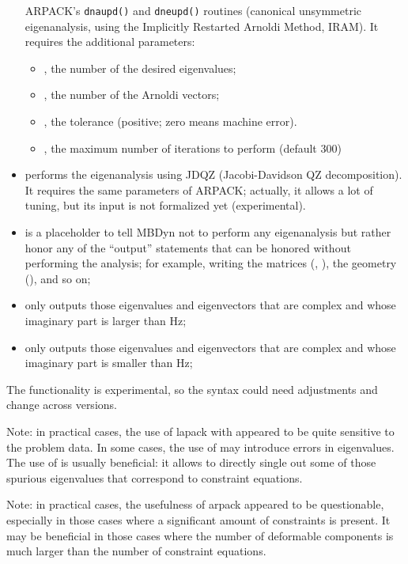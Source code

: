 \begin{itemize}
	ARPACK's \texttt{dnaupd()} and \texttt{dneupd()} routines
	(canonical unsymmetric eigenanalysis,
	using the Implicitly Restarted Arnoldi Method, IRAM).
	It requires the additional parameters:
	\begin{itemize}
	\item {}, the number of the desired eigenvalues;
	\item {}, the number of the Arnoldi vectors;
	\item {}, the tolerance (positive; zero means machine error).
        \item {}, the maximum number of iterations to perform (default 300)
	\end{itemize}
\item {} performs the eigenanalysis using JDQZ (Jacobi-Davidson QZ
	decomposition).
	It requires the same parameters of ARPACK;
	actually, it allows a lot of tuning, but its input
	is not formalized yet (experimental).
\item {} is a placeholder to tell MBDyn not to perform any eigenanalysis
	but rather honor any of the ``output'' statements that can be honored without performing the analysis;
	for example, writing the matrices (, ),
	the geometry (), and so on;
\item {} only outputs those eigenvalues and eigenvectors
	that are complex and whose imaginary part is larger than
	 Hz;
\item {} only outputs those eigenvalues and eigenvectors
	that are complex and whose imaginary part is smaller than
	 Hz;
\end{itemize}

The  functionality is experimental,
so the syntax could need adjustments and change across versions.

Note: in practical cases, the use of lapack with 
appeared to be quite sensitive to the problem data.
In some cases, the use of  may introduce errors
in eigenvalues.
The use of  is usually beneficial: it allows to directly
single out some of those spurious eigenvalues that correspond
to constraint equations.

Note: in practical cases, the usefulness of arpack appeared
to be questionable, especially in those cases where a significant amount
of constraints is present.
It may be beneficial in those cases where the number of deformable components
is much larger than the number of constraint equations.

